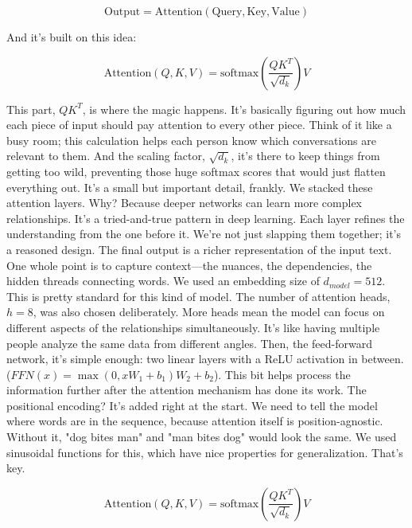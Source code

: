 \documentclass{article}
\begin{document}
$$
\text{Output} = \text{Attention}(\text{Query}, \text{Key}, \text{Value})
$$

And it’s built on this idea:

$$
\text{Attention}(Q, K, V) = \text{softmax}(\frac{QK^T}{\sqrt{d_k}})V
$$

This part, $QK^T$, is where the magic happens. It's basically figuring out how much each piece of input should pay attention to every other piece. Think of it like a busy room; this calculation helps each person know which conversations are relevant to them. And the scaling factor, $\sqrt{d_k}$, it’s there to keep things from getting too wild, preventing those huge softmax scores that would just flatten everything out. It’s a small but important detail, frankly. We stacked these attention layers. Why? Because deeper networks can learn more complex relationships. It’s a tried-and-true pattern in deep learning. Each layer refines the understanding from the one before it. We're not just slapping them together; it’s a reasoned design. The final output is a richer representation of the input text. One whole point is to capture context—the nuances, the dependencies, the hidden threads connecting words. We used an embedding size of $d_{model} = 512$. This is pretty standard for this kind of model. The number of attention heads, $h = 8$, was also chosen deliberately. More heads mean the model can focus on different aspects of the relationships simultaneously. It’s like having multiple people analyze the same data from different angles. Then, the feed-forward network, it's simple enough: two linear layers with a ReLU activation in between. ($FFN(x) = \max(0, xW_1 + b_1)W_2 + b_2$). This bit helps process the information further after the attention mechanism has done its work. The positional encoding? It's added right at the start. We need to tell the model where words are in the sequence, because attention itself is position-agnostic. Without it, "dog bites man" and "man bites dog" would look the same. We used sinusoidal functions for this, which have nice properties for generalization. That’s key.

\begin{equation}
\text{Attention}(Q, K, V) = \text{softmax}\left(\frac{QK^T}{\sqrt{d_k}}\right)V
\end{equation}
\end{document}
